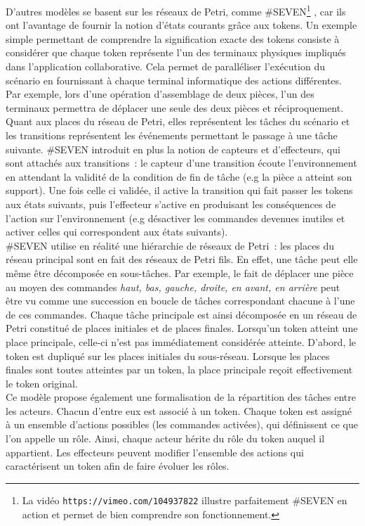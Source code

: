 \documentclass[11pt]{article}
\begin{document}
D'autres modèles se basent sur les réseaux de Petri, comme \#SEVEN\footnote{La vidéo \texttt{https://vimeo.com/104937822} illustre parfaitement \#SEVEN en action et permet de bien comprendre son fonctionnement.} \cite{seven}, car ils ont l'avantage de fournir la notion d'états courants grâce aux tokens. Un exemple simple permettant de comprendre la signification exacte des tokens consiste à considérer que chaque token représente l'un des terminaux physiques impliqués dans l'application collaborative. Cela permet de paralléliser l'exécution du scénario en fournissant à chaque terminal informatique des actions différentes. Par exemple, lors d'une opération d'assemblage de deux pièces, l'un des terminaux permettra de déplacer une seule des deux pièces et réciproquement. Quant aux places du réseau de Petri, elles représentent les tâches du scénario et les transitions représentent les événements permettant le passage à une tâche suivante. \#SEVEN introduit en plus la notion de capteurs et d'effecteurs, qui sont attachés aux transitions~: le capteur d'une transition écoute l'environnement en attendant la validité de la condition de fin de tâche (e.g la pièce a atteint son support). Une fois celle ci validée, il active la transition qui fait passer les tokens aux états suivants, puis l'effecteur s'active en produisant les conséquences de l'action sur l'environnement (e.g désactiver les commandes devenues inutiles et activer celles qui correspondent aux états suivants).
\\

\#SEVEN utilise en réalité une hiérarchie de réseaux de Petri~: les places du réseau principal sont en fait des réseaux de Petri fils. En effet, une tâche peut elle même être décomposée en sous-tâches. Par exemple, le fait de déplacer une pièce au moyen des commandes \textit{haut, bas, gauche, droite, en avant, en arrière} peut être vu comme une succession en boucle de tâches correspondant chacune à l'une de ces commandes. Chaque tâche principale est ainsi décomposée en un réseau de Petri constitué de places initiales et de places finales. Lorsqu'un token atteint une place principale, celle-ci n'est pas immédiatement considérée atteinte. D'abord, le token est dupliqué sur les places initiales du sous-réseau. Lorsque les places finales sont toutes atteintes par un token, la place principale reçoit effectivement le token original.
\\

Ce modèle propose également une formalisation de la répartition des tâches entre les acteurs. Chacun d'entre eux est associé à un token. Chaque token est assigné à un ensemble d'actions possibles (les commandes activées), qui définissent ce que l'on appelle un rôle. Ainsi, chaque acteur hérite du rôle du token auquel il appartient. Les effecteurs peuvent modifier l'ensemble des actions qui caractérisent un token afin de faire évoluer les rôles.
\\
\end{document}
